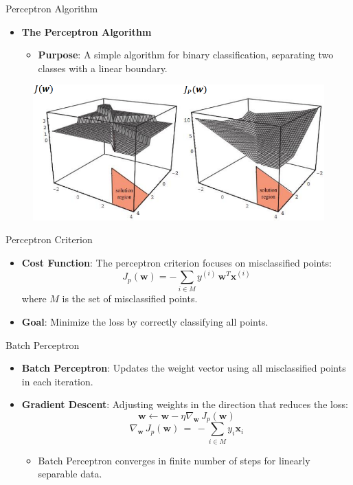 \documentclass[serif, aspectratio=169]{beamer}
\begin{document}
\begin{frame}{Perceptron Algorithm}
    \begin{itemize}
        \item \textbf{The Perceptron Algorithm}
        \medskip
        \begin{itemize}\itemsep1em
            \item \justifying \textbf{Purpose}:
            A simple algorithm for binary classification, separating two classes with a linear boundary.
        \end{itemize}
    \end{itemize}
    \begin{figure}
        \centering
        \includegraphics[width=0.7\linewidth]{pic/Figure_13.png}
    \end{figure}
\end{frame}


\begin{frame}{Perceptron Criterion}
    \begin{itemize}\itemsep1.2em
        \item \textbf{Cost Function}:
        The perceptron criterion focuses on misclassified points:
        \[
        J_p(\mathbf{w}) = - \sum_{i \in M} y^{(i)} \, \mathbf{w}^T \mathbf{x}^{(i)}
        \]
        where \( M \) is the set of misclassified points.
        \item \textbf{Goal}:
        Minimize the loss by correctly classifying all points.
    \end{itemize}
\end{frame}


\begin{frame}{Batch Perceptron}
    \begin{itemize}\itemsep1.5em
        \item \justifying \textbf{Batch Perceptron}:
        Updates the weight vector using all misclassified points in each iteration.
        \item \justifying \textbf{Gradient Descent}:
        Adjusting weights in the direction that reduces the loss:
        \[
        \mathbf{w} \leftarrow \mathbf{w} - \eta \nabla_\mathbf{w} \, J_p(\mathbf{w})
        \]
        \[
        \nabla_\mathbf{w} \, J_p(\mathbf{w}) \, = \, - \sum_{i \in M} y_i \mathbf{x}_i
        \]
        \begin{itemize}
            \item Batch Perceptron converges in finite number of steps for linearly separable data.
        \end{itemize}
    \end{itemize}
\end{frame}
\end{document}
